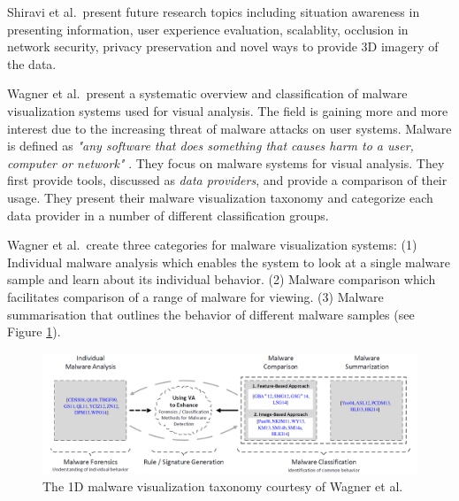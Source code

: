 Shiravi et al.\ present future research topics including situation awareness in presenting information, user experience evaluation, scalablity, occlusion in network security, privacy preservation and   novel ways to provide 3D imagery of the data.


Wagner et al.\ present a systematic overview and classification of malware visualization systems used for visual analysis. The field is gaining more and more interest due to the increasing threat of malware attacks on user systems. Malware is defined as \textit{"any software that does something that causes harm to a user, computer or network"} \cite{wagner2015survey}.
They focus on malware systems for visual analysis. They first provide tools, discussed as \textit{data providers}, and provide a comparison of their usage. They present their malware visualization taxonomy and categorize each data provider in a number of different classification groups.

Wagner et al.\  create three categories for malware visualization systems: (1) Individual malware analysis which enables the system to look at a single malware sample and learn about its individual behavior. (2) Malware comparison which facilitates comparison of a range of malware for viewing. (3) Malware summarisation that outlines the behavior of different malware samples (see Figure \ref{fig: wagner}).

\begin{figure}[t]
\begin{center}
\includegraphics[width=1\textwidth]{images/wagner2015survey.png}
\caption{The 1D malware visualization taxonomy courtesy of Wagner et al.\ \cite{wagner2015survey}} \label{fig: wagner}
\end{center}
\end{figure}

